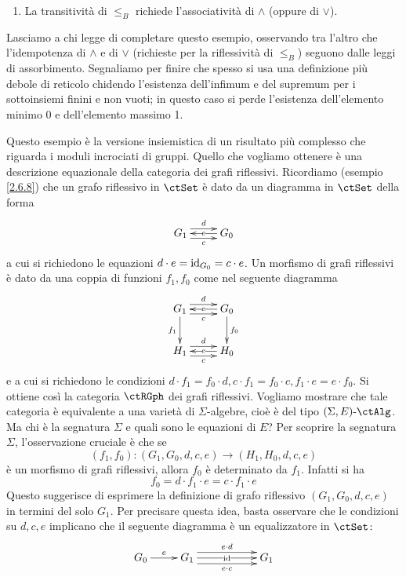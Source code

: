 \begin{example}
\begin{enumerate}
        si adotta).
  \item[(iv)] La transitività di \(\leq_B\) richiede l'associatività di \(\wedge\) (oppure di \(\vee\)).
 \end{enumerate}
 Lasciamo a chi legge di completare questo esempio, osservando tra l'altro che l'idempotenza di \(\wedge\) e di \(\vee\) (richieste per
 la riflessività di \(\leq_B\)) seguono dalle leggi di assorbimento. Segnaliamo per finire che spesso si usa una definizione più debole di
 reticolo chidendo l'esistenza dell'infimum e del supremum per i sottoinsiemi finini e non vuoti; in questo caso si perde l'esistenza
 dell'elemento minimo 0 e dell'elemento massimo 1.
\end{example}

\begin{example}\label{esempio_grafi_riflessivi}
 Questo esempio è la versione insiemistica di un risultato più complesso che riguarda i moduli incrociati di gruppi. Quello che
 vogliamo ottenere è una descrizione equazionale della categoria dei grafi riflessivi. Ricordiamo (esempio \ref{2.6.8}) che un grafo
 riflessivo in \(\ctSet\) è dato da un diagramma in \(\ctSet\) della forma
 \[\xymatrix{G_1 \ar@<1.0ex>[r]^-{d} \ar@<-1.0ex>[r]_-{c} & G_0 \ar[l]|{e}}\]
 a cui si richiedono le equazioni \(d \cdot e = \mathrm{id}_{G_0} = c \cdot e\). Un morfismo di grafi riflessivi è dato da una coppia di funzioni
 \(f_1,f_0\) come nel seguente diagramma
 \[\xymatrix{G_1 \ar@<1.0ex>[r]^-{d} \ar@<-1.0ex>[r]_-{c} \ar[d]_{f_1} & G_0 \ar[l]|{e} \ar[d]^{f_0} \\
  H_1 \ar@<1.0ex>[r]^-{d} \ar@<-1.0ex>[r]_-{c} & H_0 \ar[l]|{e}}\]
 e a cui si richiedono le condizioni \(d \cdot f_1 = f_0 \cdot d, c \cdot f_1 = f_0 \cdot c, f_1 \cdot e = e \cdot f_0\). Si ottiene così la
 categoria \(\ctRGph\) dei grafi riflessivi. Vogliamo mostrare che tale categoria è equivalente a una varietà di \(\Sigma\)-algebre,
 cioè è del tipo \(\ctSEAlg\). Ma chi è la segnatura \(\Sigma\) e quali sono le equazioni di \(E\)? Per scoprire la segnatura
 \(\Sigma\), l'osservazione cruciale è che se
 \[(f_1,f_0) \colon (G_1,G_0,d,c,e) \to (H_1,H_0,d,c,e)\]
 è un morfismo di grafi riflessivi, allora \(f_0\) è determinato da \(f_1\). Infatti si ha
 \[f_0 = d \cdot f_1 \cdot e = c \cdot f_1 \cdot e\]
 Questo suggerisce di esprimere la definizione di grafo riflessivo \((G_1,G_0,d,c,e)\) in termini del solo \(G_1\). Per precisare questa
 idea, basta osservare che le condizioni su \(d,c,e\) implicano che il seguente diagramma è un equalizzatore in \(\ctSet \colon\)
 \[\xymatrix{G_0 \ar[r]^-{e} & G_1 \ar@<1.2ex>[rr]^-{e \cdot d} \ar[rr]|-{\id} \ar@<-1.2ex>[rr]_-{e \cdot c} & & G_1}\]

\end{example}
